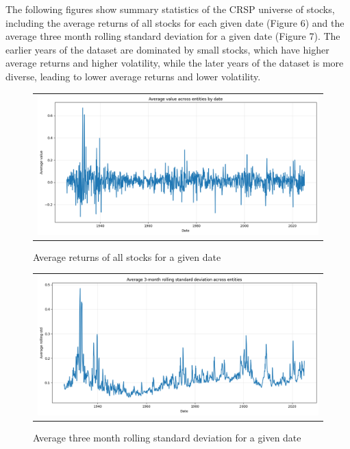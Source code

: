 \documentclass{article}
\begin{document}
\begin{appendices}
The following figures show summary statistics of the CRSP universe of stocks, 
including the average returns of all stocks for each given date (Figure 6) 
and the average three month rolling standard deviation for a given date (Figure 7).
The earlier years of the dataset are dominated by small stocks, 
which have higher average returns and higher volatility, while the later years of 
the dataset is more diverse, leading to lower average returns and lower volatility.

\begin{figure}[h]
  \centering
  \begin{tabular}{@{}c@{}}
    \includegraphics[width=.95\linewidth]{../docs_src/daily_avg_returns_CRSP_COMPU.png}
  \end{tabular}
  \caption{Average returns of all stocks for a given date}
  \label{fig:avg_returns_crsp}
\end{figure}

\begin{figure}[h]
  \centering
  \begin{tabular}{@{}c@{}}
    \includegraphics[width=.95\linewidth]{../docs_src/Average_three_month_rolling_std.png}
  \end{tabular}
  \caption{Average three month rolling standard deviation for a given date}
  \label{fig:avg_rolling_std_crsp}
\end{figure}



\end{appendices}
\end{document}
